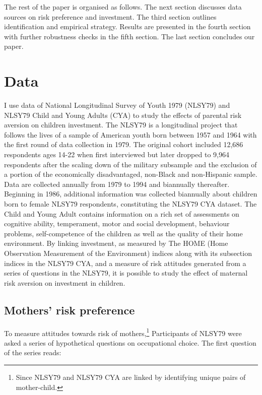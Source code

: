 \documentclass[emulatestandardclasses, 10pt, abstract = true]{scrartcl}
\begin{document}
The rest of the paper is organised as follows. The next section discusses data sources on risk preference and investment. The third section outlines identification and empirical strategy. Results are presented in the fourth section with further robustness checks in the fifth section. The last section concludes our paper.



\section{Data}
I use data of National Longitudinal Survey of Youth 1979 (NLSY79) and NLSY79 Child and Young Adults (CYA) to study the effects of parental risk aversion on children investment. The NLSY79 is a longitudinal project that follows the lives of a sample of American youth born between 1957 and 1964 with the first round of data collection in 1979. The original cohort included 12,686 respondents ages 14-22 when first interviewed but later dropped to 9,964 respondents after the scaling down of the military subsample and the exclusion of a portion of the economically disadvantaged, non-Black and non-Hispanic sample. Data are collected annually from 1979 to 1994 and biannually thereafter. Beginning in 1986, additional information was collected biannually about children born to female NLSY79 respondents, constituting the NLSY79 CYA dataset. The Child and Young Adult contains information on a rich set of assessments on cognitive ability, temperament, motor and social development, behaviour problems, self-competence of the children as well as the quality of their home environment. By linking investment, as measured by The HOME (Home Observation Measurement of the Environment) indices along with its subsection indices in the NLSY79 CYA, and a measure of risk attitudes generated from a series of questions in the NLSY79, it is possible to study the effect of maternal risk aversion on investment in children.

\subsection{Mothers' risk preference}
To measure attitudes towards risk of mothers,\footnote{Since NLSY79 and NLSY79 CYA are linked by identifying unique pairs of mother-child.} Participants of NLSY79 were asked a series of hypothetical questions on occupational choice. The first question of the series reads:
\end{document}
